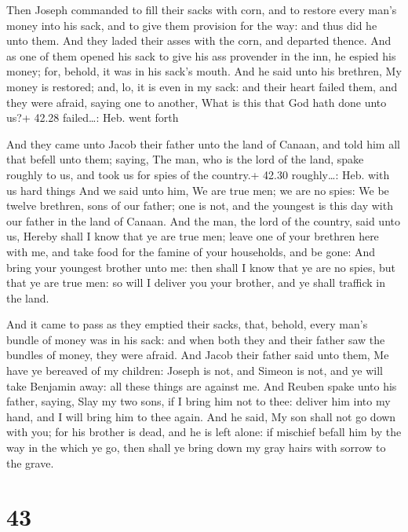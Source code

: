  Then Joseph commanded to fill their sacks with corn, and
to restore every man's money into his sack, and to give them provision
for the way: and thus did he unto them.  And they laded
their asses with the corn, and departed thence.  And as one
of them opened his sack to give his ass provender in the inn, he espied
his money; for, behold, it was in his sack's mouth.  And he
said unto his brethren, My money is restored; and, lo, it is even in my
sack: and their heart failed them, and they were afraid, saying one to
another, What is this that God hath done unto us?+ 42.28 failed\ldots:
Heb. went forth

 And they came unto Jacob their father unto the land of
Canaan, and told him all that befell unto them; saying, 
The man, who is the lord of the land, spake roughly to us, and took us
for spies of the country.+ 42.30 roughly\ldots: Heb. with us hard things
 And we said unto him, We are true men; we are no spies:
 We be twelve brethren, sons of our father; one is not, and
the youngest is this day with our father in the land of Canaan.
 And the man, the lord of the country, said unto us, Hereby
shall I know that ye are true men; leave one of your brethren here with
me, and take food for the famine of your households, and be gone:
 And bring your youngest brother unto me: then shall I know
that ye are no spies, but that ye are true men: so will I deliver you
your brother, and ye shall traffick in the land.

 And it came to pass as they emptied their sacks, that,
behold, every man's bundle of money was in his sack: and when both they
and their father saw the bundles of money, they were afraid.
 And Jacob their father said unto them, Me have ye bereaved
of my children: Joseph is not, and Simeon is not, and ye will take
Benjamin away: all these things are against me.  And Reuben
spake unto his father, saying, Slay my two sons, if I bring him not to
thee: deliver him into my hand, and I will bring him to thee again.
 And he said, My son shall not go down with you; for his
brother is dead, and he is left alone: if mischief befall him by the way
in the which ye go, then shall ye bring down my gray hairs with sorrow
to the grave.

\hypertarget{section-42}{%
\section{43}\label{section-42}}

